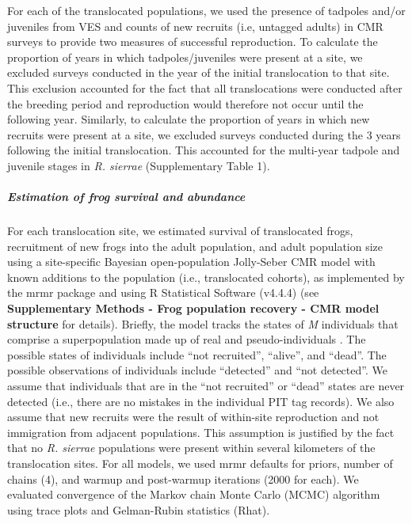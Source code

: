 \documentclass[
  letterpaper,
  DIV=11,
  numbers=noendperiod]{scrartcl}
\let\oldsubparagraph\subparagraph
\renewcommand{\subparagraph}[1]{\oldsubparagraph{#1}\mbox{}}
\begin{document}
For each of the translocated populations, we used the presence of
tadpoles and/or juveniles from VES and counts of new recruits (i.e,
untagged adults) in CMR surveys to provide two measures of successful
reproduction. To calculate the proportion of years in which
tadpoles/juveniles were present at a site, we excluded surveys conducted
in the year of the initial translocation to that site. This exclusion
accounted for the fact that all translocations were conducted after the
breeding period and reproduction would therefore not occur until the
following year. Similarly, to calculate the proportion of years in which
new recruits were present at a site, we excluded surveys conducted
during the 3 years following the initial translocation. This accounted
for the multi-year tadpole and juvenile stages in \emph{R. sierrae}
(Supplementary Table 1).

\subparagraph{Estimation of frog survival and
abundance}\label{estimation-of-frog-survival-and-abundance}

For each translocation site, we estimated survival of translocated
frogs, recruitment of new frogs into the adult population, and adult
population size using a site-specific Bayesian open-population
Jolly-Seber CMR model with known additions to the population (i.e.,
translocated cohorts), as implemented by the mrmr package
\citep{joseph2019} and using R Statistical Software
\citep{rsoftware2022} (v4.4.4) (see \textbf{Supplementary Methods - Frog
population recovery - CMR model structure} for details). Briefly, the
model tracks the states of \emph{M} individuals that comprise a
superpopulation made up of real and pseudo-individuals
\citep{joseph2018}. The possible states of individuals include ``not
recruited'', ``alive'', and ``dead''. The possible observations of
individuals include ``detected'' and ``not detected''. We assume that
individuals that are in the ``not recruited'' or ``dead'' states are
never detected (i.e., there are no mistakes in the individual PIT tag
records). We also assume that new recruits were the result of
within-site reproduction and not immigration from adjacent populations.
This assumption is justified by the fact that no \emph{R. sierrae}
populations were present within several kilometers of the translocation
sites. For all models, we used mrmr defaults for priors, number of
chains (4), and warmup and post-warmup iterations (2000 for each). We
evaluated convergence of the Markov chain Monte Carlo (MCMC) algorithm
using trace plots and Gelman-Rubin statistics (Rhat).
\end{document}
